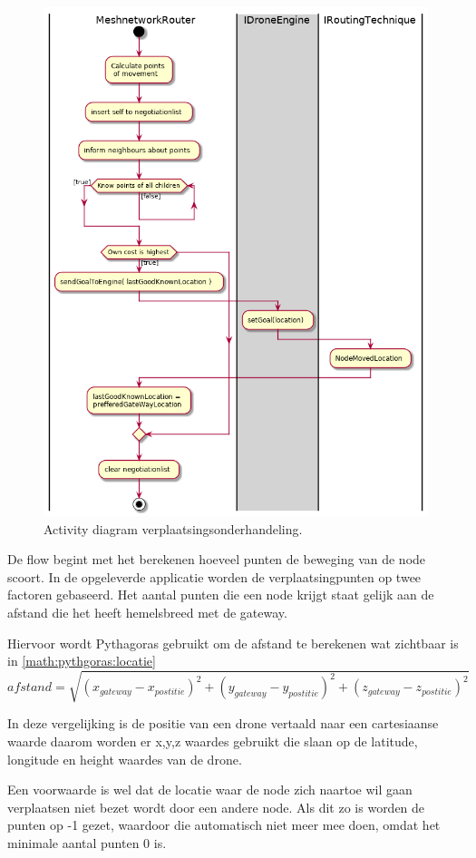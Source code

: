 \documentclass[a4paper, 11pt, oneside]{report}
\begin{document}
\begin{figure}[H]
	\begin{center}\includegraphics[width=.6\linewidth]{UML/out/Communication/activity/MovementNegotiation/MovementNegotiation.png}\end{center}
	\caption{Activity diagram verplaatsingsonderhandeling.}
	\label{fig:communication:activity:verplaatsingsonderhandeling}
\end{figure}
De flow begint met het berekenen hoeveel punten de beweging van de node scoort.
In de opgeleverde applicatie worden de verplaatsingpunten op twee factoren gebaseerd.
Het aantal punten die een node krijgt staat gelijk aan de afstand die het heeft hemelsbreed met de gateway.

Hiervoor wordt Pythagoras gebruikt om de afstand te berekenen wat zichtbaar is in \autoref{math:pythgoras:locatie} 
\begin{equation}
\label{math:pythgoras:locatie}
afstand =   \sqrt{(x_{gateway} - x_{postitie})^2+(y_{gateway} - y_{postitie})^2+(z_{gateway} - z_{postitie})^2}							
\end{equation}

In deze vergelijking is de positie van een drone vertaald naar een cartesiaanse waarde daarom worden er x,y,z waardes gebruikt die slaan op de latitude, longitude en height waardes van de drone.

Een voorwaarde is wel dat de locatie waar de node zich naartoe wil gaan verplaatsen niet bezet wordt door een andere node. Als dit zo is worden de punten op -1 gezet, waardoor die automatisch niet meer mee doen, omdat het minimale aantal punten 0 is.
\end{document}
